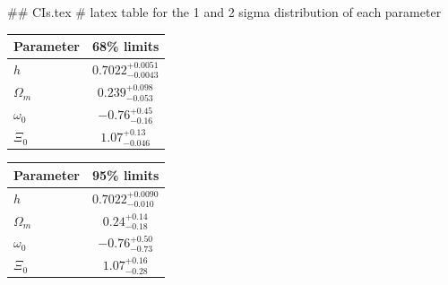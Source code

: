 ## CIs.tex
# latex table for the 1 and 2 sigma distribution of each parameter

\begin{tabular} { l  c}
 Parameter &  68\% limits\\
\hline
{\boldmath$h              $} & $0.7022^{+0.0051}_{-0.0043}$\\
{\boldmath$\Omega_m       $} & $0.239^{+0.098}_{-0.053}   $\\
{\boldmath$\omega_0       $} & $-0.76^{+0.45}_{-0.16}     $\\
{\boldmath$\Xi_0          $} & $1.07^{+0.13}_{-0.046}     $\\
\hline
\end{tabular}

\begin{tabular} { l  c}
 Parameter &  95\% limits\\
\hline
{\boldmath$h              $} & $0.7022^{+0.0090}_{-0.010} $\\
{\boldmath$\Omega_m       $} & $0.24^{+0.14}_{-0.18}      $\\
{\boldmath$\omega_0       $} & $-0.76^{+0.50}_{-0.73}     $\\
{\boldmath$\Xi_0          $} & $1.07^{+0.16}_{-0.28}      $\\
\hline
\end{tabular}
